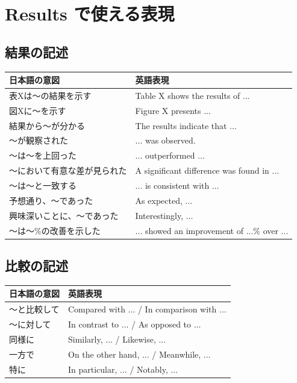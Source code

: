 \section{Results で使える表現}

\subsection*{結果の記述}

\begin{table}[H]
\centering
\small
\begin{tabular}{p{4cm}p{6cm}}
\toprule
日本語の意図 & 英語表現 \\
\midrule
表Xは〜の結果を示す & Table X shows the results of ... \\
図Xに〜を示す & Figure X presents ... \\
結果から〜が分かる & The results indicate that ... \\
〜が観察された & ... was observed. \\
〜は〜を上回った & ... outperformed ... \\
〜において有意な差が見られた & A significant difference was found in ... \\
〜は〜と一致する & ... is consistent with ... \\
予想通り、〜であった & As expected, ... \\
興味深いことに、〜であった & Interestingly, ... \\
〜は〜\%の改善を示した & ... showed an improvement of ...\% over ... \\
\bottomrule
\end{tabular}
\end{table}

\subsection*{比較の記述}

\begin{table}[H]
\centering
\small
\begin{tabular}{p{4cm}p{6cm}}
\toprule
日本語の意図 & 英語表現 \\
\midrule
〜と比較して & Compared with ... / In comparison with ... \\
〜に対して & In contrast to ... / As opposed to ... \\
同様に & Similarly, ... / Likewise, ... \\
一方で & On the other hand, ... / Meanwhile, ... \\
特に & In particular, ... / Notably, ... \\
\bottomrule
\end{tabular}
\end{table}

